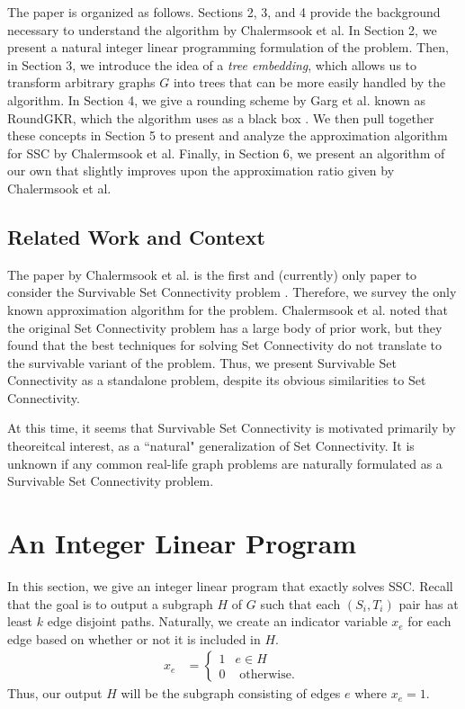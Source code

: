 \documentclass[12pt]{article}
\begin{document}
The paper is organized as follows. Sections 2, 3, and 4 provide the background necessary to understand the algorithm by Chalermsook et al. In Section 2, we present a natural integer linear programming formulation of the problem. Then, in Section 3, we introduce the idea of a \emph{tree embedding}, which allows us to transform arbitrary graphs $G$ into trees that can be more easily handled by the algorithm. In Section 4, we give a rounding scheme by Garg et al. known as RoundGKR, which the algorithm uses as a black box \cite{GKR}. We then pull together these concepts in Section 5 to present and analyze the approximation algorithm for SSC by Chalermsook et al. Finally, in Section 6, we present an algorithm of our own that slightly improves upon the approximation ratio given by Chalermsook et al.

\subsection{Related Work and Context}

The paper by Chalermsook et al. is the first and (currently) only paper to consider the Survivable Set Connectivity problem \cite{ssc}. Therefore, we survey the only known approximation algorithm for the problem. Chalermsook et al. noted that the original Set Connectivity problem has a large body of prior work, but they found that the best techniques for solving Set Connectivity do not translate to the survivable variant of the problem. Thus, we present Survivable Set Connectivity as a standalone problem, despite its obvious similarities to Set Connectivity.

At this time, it seems that Survivable Set Connectivity is motivated primarily by theoreitcal interest, as a ``natural" generalization of Set Connectivity. It is unknown if any common real-life graph problems are naturally formulated as a Survivable Set Connectivity problem.

\section{An Integer Linear Program}

In this section, we give an integer linear program that exactly solves SSC. Recall that the goal is to output a subgraph $H$ of $G$ such that each $(S_i,T_i)$ pair has at least $k$ edge disjoint paths. Naturally, we create an indicator variable $x_e$ for each edge based on whether or not it is included in $H$. 
\begin{align}
 x_e &= \left\{ \begin{array}{cc} 1 & e \in H \\
                                  0 & \text{ otherwise. } \end{array} \right.
\end{align}
Thus, our output $H$ will be the subgraph consisting of edges $e$ where $x_e = 1$. \\ \\
\end{document}
